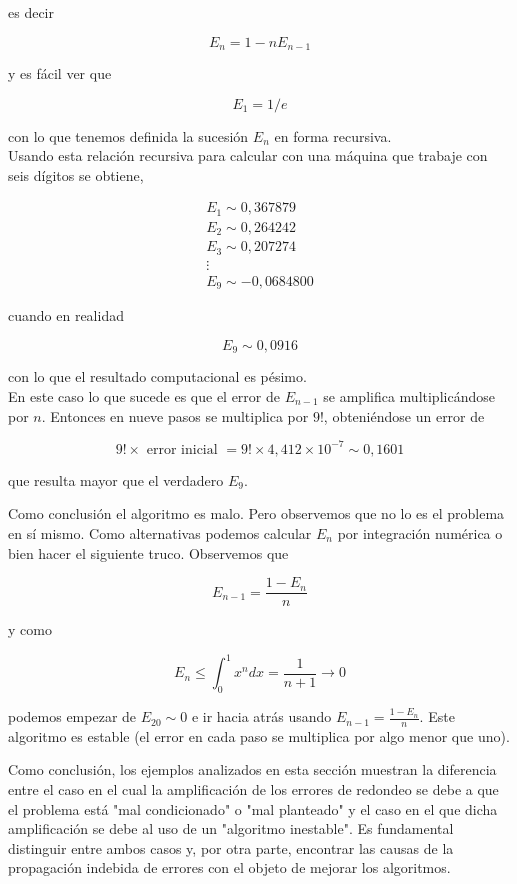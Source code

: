 \documentclass[10pt]{article}
\begin{document}
es decir

$$
E_{n}=1-n E_{n-1}
$$

y es fácil ver que

$$
E_{1}=1 / e
$$

con lo que tenemos definida la sucesión $E_{n}$ en forma recursiva.\\
Usando esta relación recursiva para calcular con una máquina que trabaje con seis dígitos se obtiene,

$$
\begin{gathered}
E_{1} \sim 0,367879 \\
E_{2} \sim 0,264242 \\
E_{3} \sim 0,207274 \\
\vdots \\
E_{9} \sim-0,0684800
\end{gathered}
$$

cuando en realidad

$$
E_{9} \sim 0,0916
$$

con lo que el resultado computacional es pésimo.\\
En este caso lo que sucede es que el error de $E_{n-1}$ se amplifica multiplicándose por $n$. Entonces en nueve pasos se multiplica por $9!$, obteniéndose un error de

$$
9!\times \text { error inicial }=9!\times 4,412 \times 10^{-7} \sim 0,1601
$$

que resulta mayor que el verdadero $E_{9}$.

Como conclusión el algoritmo es malo. Pero observemos que no lo es el problema en sí mismo. Como alternativas podemos calcular $E_{n}$ por integración numérica o bien hacer el siguiente truco. Observemos que

$$
E_{n-1}=\frac{1-E_{n}}{n}
$$

y como

$$
E_{n} \leq \int_{0}^{1} x^{n} d x=\frac{1}{n+1} \rightarrow 0
$$

podemos empezar de $E_{20} \sim 0$ e ir hacia atrás usando $E_{n-1}=\frac{1-E_{n}}{n}$. Este algoritmo es estable (el error en cada paso se multiplica por algo menor que uno).

Como conclusión, los ejemplos analizados en esta sección muestran la diferencia entre el caso en el cual la amplificación de los errores de redondeo se debe a que el problema está "mal condicionado" o "mal planteado" y el caso en el que dicha amplificación se debe al uso de un "algoritmo inestable". Es fundamental distinguir entre ambos casos y, por otra parte, encontrar las causas de la propagación indebida de errores con el objeto de mejorar los algoritmos.
\end{document}
